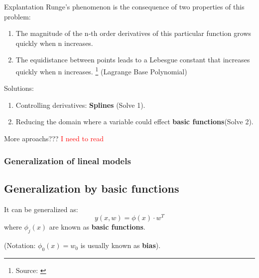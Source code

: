   \begin{frame}{Explantation}
    Runge's phenomenon is the consequence of two properties of this problem: 
    \begin{enumerate}
      \item   The magnitude of the n-th order derivatives of this particular function grows quickly when n increases.
      \item   The equidistance between points leads to a Lebesgue constant that increases quickly when n increases. \footnote{Source: \cite{LebesgueConstant}} (Lagrange Base Polynomial)
    \end{enumerate}
  
    Solutions: 
    \begin{enumerate}
      \item Controlling derivatives: \textbf{Splines} (Solve 1).
      \item Reducing the domain where a variable could effect \textbf{basic functions}(Solve 2).
    \end{enumerate}
  
    More aproachs??? \textcolor{red}{I need to read \cite{ACourseInApproximationTheory}}
  \end{frame}
  
  \begin{frame}
    \frametitle{Generalization of lineal models}
    \subsection{Generalization by basic functions}
    It can be generalized as: 
      \begin{equation}
        y(x,w) = \phi(x) \cdot w^T
      \end{equation}
      where $\phi_j(x)$ are known as \textbf{basic functions}. 
  
      (Notation: $\phi_0(x) = w_0$ is usually known as \textbf{bias}). 
  
  \end{frame}
  
